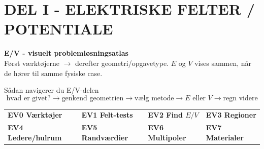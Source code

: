 \documentclass[10pt,a4paper]{article}
\begin{document}
\section*{DEL I - ELEKTRISKE FELTER / POTENTIALE}
{}
\begin{center}
{\Large\bfseries E/V - visuelt problemløsningsatlas}\\[1mm]
{\small Først værktøjerne $\to$ derefter geometri/opgavetype. $E$ og $V$ vises sammen, når de hører til samme fysiske case.}
\end{center}
\vspace{1mm}
\begin{quickbox}{Sådan navigerer du E/V-delen}
\[
\boxed{\text{hvad er givet?}}
\to
\boxed{\text{genkend geometrien}}
\to
\boxed{\text{vælg metode}}
\to
\boxed{E\text{ eller }V}
\to
\boxed{\text{regn videre}}
\]
\begin{center}
\begin{tabular}{llll}
\textbf{EV0 Værktøjer} & \textbf{EV1 Felt-tests} & \textbf{EV2 Find $E/V$} & \textbf{EV3 Regioner}\\
\textbf{EV4 Ledere/hulrum} & \textbf{EV5 Randværdier} & \textbf{EV6 Multipoler} & \textbf{EV7 Materialer}
\end{tabular}
\end{center}
\end{quickbox}

\newpage
\end{document}
